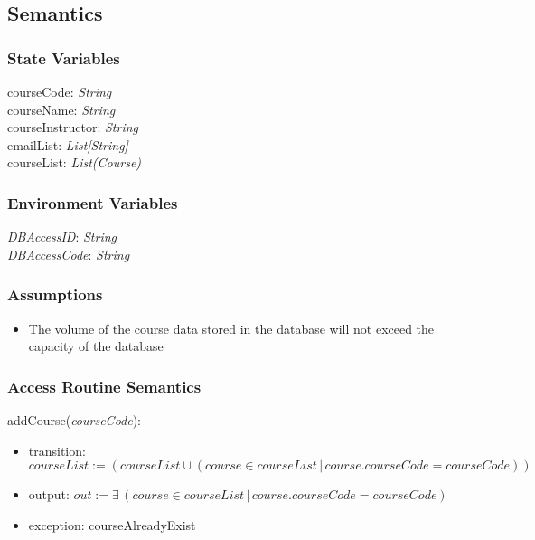 \documentclass[12pt, titlepage]{article}
\begin{document}
\subsection{Semantics}

\subsubsection{State Variables}

courseCode: \textit{String}\\
courseName: \textit{String}\\
courseInstructor: \textit{String}\\
emailList: \textit{List[String]}\\
courseList: \textit{List(Course)}\\


\subsubsection{Environment Variables}

\textit{DBAccessID}: \textit{String}\\
\textit{DBAccessCode}: \textit{String}

\subsubsection{Assumptions}

\begin{itemize}
  \item The volume of the course data stored in the database will not exceed the capacity of the database
\end{itemize}

\subsubsection{Access Routine Semantics}

\noindent addCourse(\textit{courseCode}):
\begin{itemize}
\item transition: \(courseList := (courseList \cup (course \in courseList \, | \, course.courseCode = courseCode))\)
\item output: $out := \mathit{\exists \, (course \in courseList \, | \, course.courseCode = courseCode)
}$
\item exception: courseAlreadyExist
\end{itemize}
\end{document}

